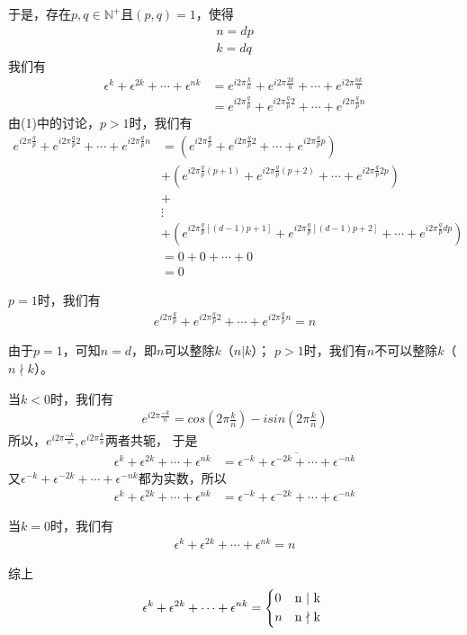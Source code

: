 \documentclass{article}
\begin{document}
于是，存在$p, q \in \mathbb{N}^+$且$(p,q) = 1$，使得
\begin{align*}
  n = dp \\
  k = dq
\end{align*}
我们有
\begin{align*}
  \epsilon^k + \epsilon^{2k} + \cdots + \epsilon^{nk}
   & = e^{i 2\pi \frac{k}{n}} + e^{i 2\pi \frac{2k}{n}} + \cdots + e^{i 2\pi \frac{nk}{n}}  \\
   & = e^{i 2\pi \frac{q}{p}} + e^{i 2\pi \frac{q}{p} 2} + \cdots + e^{i 2\pi \frac{q}{p}n}
\end{align*}
由(1)中的讨论，$p > 1$时，我们有
\begin{align*}
  e^{i 2\pi \frac{q}{p}} + e^{i 2\pi \frac{q}{p} 2} + \cdots + e^{i 2\pi \frac{q}{p}n}
   & = (e^{i 2\pi \frac{q}{p}} + e^{i 2\pi \frac{q}{p} 2} + \cdots + e^{i 2\pi \frac{q}{p}p})                    \\
   & +
  (e^{i 2\pi \frac{q}{p}(p+1)} + e^{i 2\pi \frac{q}{p} (p+2)} + \cdots + e^{i 2\pi \frac{q}{p}2p})               \\
   & +                                                                                                           \\
   & \vdots                                                                                                      \\
   & +
  (e^{i 2\pi \frac{q}{p}[(d-1)p + 1]} + e^{i 2\pi \frac{q}{p} [(d-1)p + 2]} + \cdots + e^{i 2\pi \frac{q}{p}dp}) \\
   & = 0 + 0 + \cdots + 0                                                                                        \\
   & = 0
\end{align*}

$p = 1$时，我们有
\begin{align*}
  e^{i 2\pi \frac{q}{p}} + e^{i 2\pi \frac{q}{p} 2} + \cdots + e^{i 2\pi \frac{q}{p}n} = n
\end{align*}

由于$p = 1$，可知$n = d$，即$n$可以整除$k$（$n | k$）；
$p > 1$时，我们有$n$不可以整除$k$（$n \nmid k$）。

当$k < 0$时，我们有
\begin{align*}
  e^{i 2\pi \frac{-k}{n}} = cos (2\pi \frac{k}{n}) - i sin (2\pi \frac{k}{n})
\end{align*}
所以，$e^{i 2\pi \frac{-k}{n}}, e^{i 2\pi \frac{k}{n}}$两者共轭，
于是
\begin{align*}
  \epsilon^k + \epsilon^{2k} + \cdots + \epsilon^{nk} & = \overline{\epsilon^{-k} + \epsilon^{-2k} + \cdots + \epsilon^{-nk}}
\end{align*}
又$\epsilon^{-k} + \epsilon^{-2k} + \cdots + \epsilon^{-nk}$都为实数，所以
\begin{align*}
  \epsilon^k + \epsilon^{2k} + \cdots + \epsilon^{nk} & = \epsilon^{-k} + \epsilon^{-2k} + \cdots + \epsilon^{-nk}
\end{align*}

当$k = 0$时，我们有
\begin{align*}
  \epsilon^k + \epsilon^{2k} + \cdots + \epsilon^{nk} = n
\end{align*}

综上
\begin{equation*}
  \epsilon^k + \epsilon^{2k} + \cdots + \epsilon^{nk} = \begin{cases*}
    0 & n | k     \\
    n & n $\nmid$ k
  \end{cases*}
\end{equation*}
\end{document}
